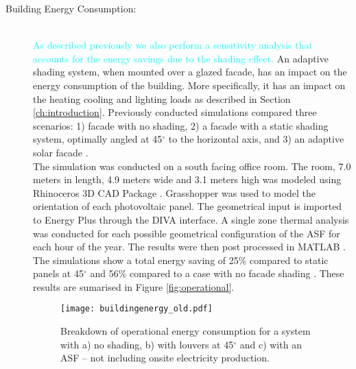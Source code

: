 \begin{description}


\item[Building Energy Consumption: ] \hfill\\
\textcolor{cyan}{As described previously we also perform  a sensitivity analysis that accounts for the energy savings due to the shading effect.} An adaptive shading system, when mounted over a glazed facade, has an impact on the energy consumption of the building. More specifically, it has an impact on the heating cooling and lighting loads as described in Section \ref{ch:introduction}. Previously conducted simulations compared three scenarios: 1) facade with no shading, 2) a facade with a static shading system, optimally angled at 45$^{\circ}$ to the horizontal axis, and 3) an adaptive solar facade \cite{jayathissa2015abs}.\\

The simulation was conducted on a south facing office room. The room, 7.0 meters in length, 4.9 meters wide and 3.1 meters high was modeled using Rhinoceros 3D CAD Package \cite{Rhino}. Grasshopper \cite{grasshopper} was used to model the orientation of each photovoltaic panel. The geometrical input is imported to Energy Plus \cite{energyplus} through the DIVA \cite{DIVA} interface. A single zone thermal analysis was conducted for each possible geometrical configuration of the ASF for each hour of the year. The results were then post processed in MATLAB \cite{MATLAB}.\\

The simulations show a total energy saving of 25\% compared to static panels at 45$^\circ$ and 56\% compared to a case with no facade shading \cite{jayathissa2015abs}. These results are sumarised in Figure \ref{fig:operational}. \\


\begin{figure}[H]
\begin{center}
\begin{mdframed}[linecolor=magenta, linewidth=2pt]
\texttt{[image: buildingenergy\_old.pdf]}
\caption{Breakdown of operational energy consumption for a system with a) no shading, b) with louvers at 45$^\circ$ and c) with an ASF -- not including onsite electricity production.}
\label{fig:operationalold}
\end{mdframed}
\end{center}
\end{figure}


\end{description}
